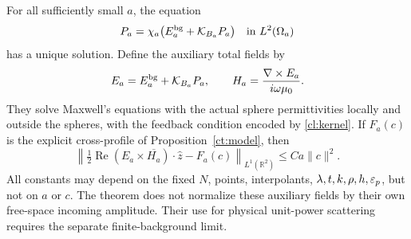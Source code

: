 \begin{theorem}
\label{cl:remainder}
For all sufficiently small $a$, the equation
\begin{equation}\label{cl:integralequation}
 P_a=\chi_a\bigl(E^{\rm bg}_a+\mathcal K_{B_a}P_a\bigr)
 \quad\hbox{in }L^2(\Omega_a)
\end{equation}
has a unique solution. Define the auxiliary total fields by
\[
 E_a=E^{\rm bg}_a+\mathcal K_{B_a}P_a,
 \qquad H_a=\frac{\nabla\times E_a}{i\omega\mu_0}.
\]
They solve Maxwell's equations with the actual sphere permittivities
locally and outside the spheres, with the feedback condition encoded
by \eqref{cl:kernel}. If $F_a(c)$ is the explicit cross-profile
of Proposition~\ref{ct:model}, then
\begin{equation}\label{cl:actualremainder}
 \left\|\tfrac12\operatorname{Re}(E_a\times\overline{H_a})
                \cdot\widehat z-F_a(c)\right\|_{L^1(\mathbb R^2)}
       \leq C a\|c\|^2.
\end{equation}
All constants may depend on the fixed $N$, points, interpolants,
$\lambda,t,k,\rho,h,\varepsilon_p$, but not on $a$ or $c$.
The theorem does not normalize these auxiliary fields by their own
free-space incoming amplitude. Their use for physical unit-power
scattering requires the separate finite-background limit.
\end{theorem}
